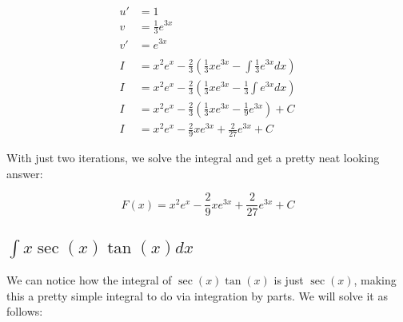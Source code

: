 \documentclass[12pt]{article}
\begin{document}
\begin{align}
    u'          & = 1                                                                                 \\
    v           & = \frac{1}{3}e^{3x}                                                                 \\
    v'          & = e^{3x}                                                                            \\
    \nonumber                                                                                         \\
    I           & = x^2e^x - \frac{2}{3} \left(\frac{1}{3}xe^{3x} - \int \frac{1}{3}e^{3x} dx\right)  \\
    I           & = x^2e^x - \frac{2}{3} \left(\frac{1}{3}xe^{3x} - \frac{1}{3} \int e^{3x} dx\right) \\
    I           & = x^2e^x - \frac{2}{3} \left(\frac{1}{3}xe^{3x} - \frac{1}{9}e^{3x} \right) + C     \\
    I           & = x^2e^x - \frac{2}{9}xe^{3x} + \frac{2}{27}e^{3x} + C
\end{align}


With just two iterations, we solve the integral and get a pretty neat looking answer:

$$
    F(x) = x^2e^x - \frac{2}{9}xe^{3x} + \frac{2}{27}e^{3x} + C
$$

\subsection{$\int x \sec(x)\tan(x) dx$}

We can notice how the integral of $\sec(x)\tan(x)$ is just $\sec(x)$, making this a pretty simple integral to do via integration by parts.
We will solve it as follows:
\end{document}
